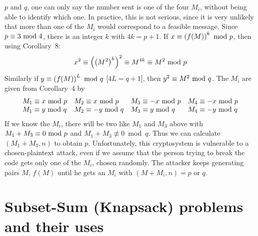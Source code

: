 $p$ and $q$, one can only say the number sent is one of the four $M_i$,
without being able to identify which one.  In practice, this is not
serious, since it is very unlikely that more than one of the $M_i$ would
correspond to a feasible message.
 Since $p\equiv3\hbox{ mod }4$, there is an integer $k$ with $4k=p+1$.
If $x\equiv\left(f(M)\right)^k\hbox{ mod }p$, then using Corollary~8:
$$x^2\equiv \left(\left(M^2\right)^k\right)^2\equiv M^{4k}\equiv M^2\hbox{ mod }p$$
Similarly if $y\equiv\left(f(M)\right)^L\hbox{ mod }q$ [$4L=q+1$], then $y^2\equiv M^2\hbox{ mod }q$.
The $M_i$ are given from Corollary~4 by$$\begin{array}{llll}
M_1\equiv x\hbox{ mod }p&M_2\equiv x\hbox{ mod }p&M_3\equiv-x\hbox{ mod }p&M_4\equiv-x\hbox{ mod }p\\
M_1\equiv y\hbox{ mod }q&M_2\equiv-y\hbox{ mod }q&M_3\equiv y\hbox{ mod }q&M_4\equiv-y\hbox{ mod }q\end{array}$$
 If we know the $M_i$, there will be two like $M_1$
and $M_3$ above with $M_1+M_3\equiv0\hbox{ mod }p$ and $M_1+M_3\not\equiv0$~mod~$q$.
Thus we can calculate $(M_1+M_3,n)$ to obtain $p$.
\pq Unfortunately, this cryptosystem is vulnerable to a chosen-plaintext
attack, even if we assume that the person trying to break the code gets
only one of the $M_i$, chosen randomly.  The attacker keeps generating
pairs $M$, $f(M)$ until he gets an $M_i$ with $(M+M_i,n)=p$ or $q$.
\section{Subset-Sum (Knapsack) problems and their uses}
